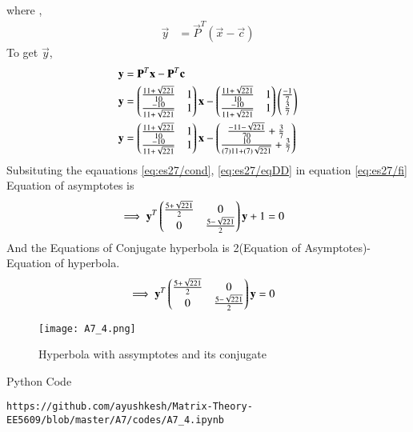 \documentclass[journal,12pt,twocolumn]{IEEEtran}
\begin{document}
where ,
\begin{align}
    \vec{y}&=\vec{P}^T(\vec{x}-\vec{c})
\end{align}
To get $\vec{y}$,
\begin{align}
\mathbf{y}&=\mathbf{P}^T\mathbf{x}-\mathbf{P}^T\mathbf{c}\\
    \mathbf{y}&= \begin{pmatrix}\frac{11+\sqrt{221}}{10} & 1 \\ \frac{-10}{11+\sqrt{221}} & 1\end{pmatrix}\mathbf{x}-\begin{pmatrix}\frac{11+\sqrt{221}}{10} & 1 \\ \frac{-10}{11+\sqrt{221}} & 1\end{pmatrix}\begin{pmatrix}\frac{-1}{7}\\\frac{3}{7}\end{pmatrix}\\
    \mathbf{y}&=\begin{pmatrix}\frac{11+\sqrt{221}}{10} & 1 \\ \frac{-10}{11+\sqrt{221}} & 1\end{pmatrix}\mathbf{x}-\begin{pmatrix}\frac{-11-\sqrt{221}}{70}+\frac{3}{7} \\ \frac{10}{(7)11+(7)\sqrt{221}}+\frac{3}{7}\end{pmatrix}
\end{align}
Subsituting the eqauations \eqref{eq:es27/cond}, \eqref{eq:es27/eqDD} in equation \eqref{eq:es27/fi}
Equation of asymptotes is
\begin{align}
    \implies \mathbf{y}^T\begin{pmatrix}\frac{5+\sqrt{221}}{2} & 0 \\0 & \frac{5-\sqrt{221}}{2}\end{pmatrix}\mathbf{y}+1&=0
\end{align}
And the Equations of Conjugate hyperbola is 2(Equation of Asymptotes)- Equation of hyperbola. 
\begin{align}
    \implies \mathbf{y}^T\begin{pmatrix}\frac{5+\sqrt{221}}{2} & 0 \\0 & \frac{5-\sqrt{221}}{2}\end{pmatrix}\mathbf{y}&=0
\end{align}
\renewcommand{\thefigure}{1}
\begin{figure}[h]
    \centering
    \texttt{[image: A7\_4.png]}
    \caption{Hyperbola with assymptotes and its conjugate}
    \label{Fig :1}
\end{figure}
Python Code 
\begin{lstlisting}
https://github.com/ayushkesh/Matrix-Theory-EE5609/blob/master/A7/codes/A7_4.ipynb
\end{lstlisting}
\end{document}
